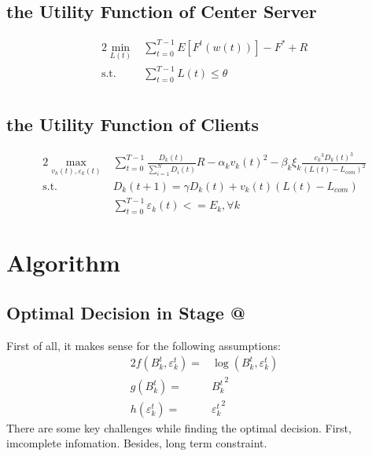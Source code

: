 \documentclass[conference]{IEEEtran}
\makeatletter
\newcommand{\Rmnum}[1]{\expandafter\@slowromancap\romannumeral #1@}
\makeatother
\begin{document}
\subsection{the Utility Function of Center Server}
\begin{alignat}{2}
    \mathop{\min}_{L(t)} & \sum_{t=0}^{T-1} E\left[F^t(w(t))\right] - F^* + R \\
    \text{s.t.} & \sum_{t=0}^{T-1} L(t) \leq \theta \\
\end{alignat}
\subsection{the Utility Function of Clients}
\begin{alignat}{2}
    \mathop{\max}_{v_k(t), \varepsilon_k(t)} & \sum_{t=0}^{T-1} \frac{D_k(t)}{\sum_{i=1}^{N} D_i(t)} R - \alpha_k {v_k(t)}^2 - \beta_k {\xi_k\frac{{c_k}^3{D_k(t)}^3}{(L(t) - L_{com})^2}} \\
    \text{s.t.} & D_k(t + 1) = \gamma D_k(t) + v_k(t)(L(t) - L_{com}) \\
                & \sum_{t=0}^{T-1} \varepsilon_k(t) <= E_k, \forall k
\end{alignat}

\section{Algorithm}

\subsection{Optimal Decision in Stage \Rmnum{2}}
First of all, it makes sense for the following assumptions:
\begin{alignat}{2}
    f(B_k^t, \varepsilon_k^t) = & \log(B_k^t, \varepsilon_k^t) \\
    g(B_k^t) = & {B_k^t}^2 \\
    h(\varepsilon_k^t) = & {\varepsilon_k^t}^2
\end{alignat}
There are some key challenges while finding the optimal decision.
First, imcomplete infomation.
Besides, long term constraint.
\end{document}
